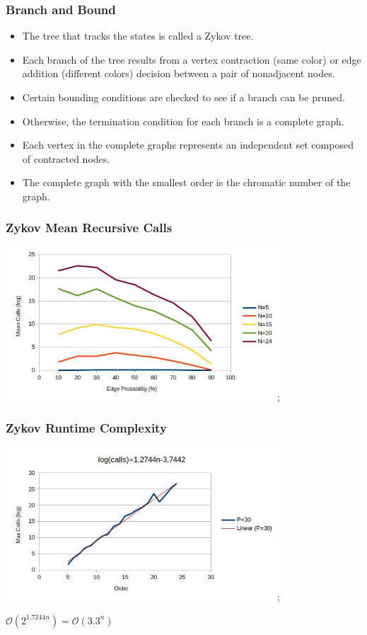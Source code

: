 \documentclass{beamer}
\newcommand{\BO}{\mathcal{O}}
\begin{document}
\begin{frame}
  \frametitle{Branch and Bound}
  \begin{itemize}
  \item The tree that tracks the states is called a Zykov tree.
  \item Each branch of the tree results from a vertex contraction (same color) or edge addition (different colors)
    decision between a pair of nonadjacent nodes.
  \item Certain bounding conditions are checked to see if a branch can be pruned.
  \item Otherwise, the termination condition for each branch is a complete graph.
  \item Each vertex in the complete graphs represents an independent set composed of contracted nodes.
  \item The complete graph with the smallest order is the chromatic number of the graph.
  \end{itemize}
\end{frame}

\begin{frame}
  \frametitle{Zykov Mean Recursive Calls}
  \begin{center}
    \includegraphics[width=4in]{../final/zykov_calls};
  \end{center}
\end{frame}

\begin{frame}
  \frametitle{Zykov Runtime Complexity}
  \begin{center}
    \includegraphics[width=4in]{../final/zykov_runtime};

    \bigskip

    \(\BO(2^{1.7244n})=\BO(3.3^n)\)
  \end{center}
\end{frame}
\end{document}
